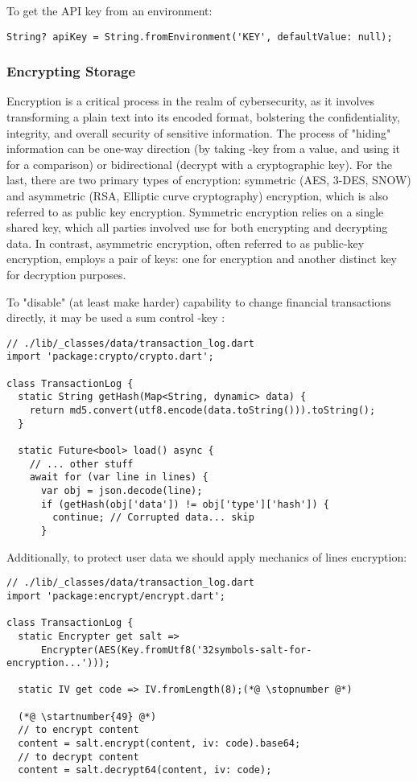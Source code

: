 \noindent To get the API key from an environment:

\begin{lstlisting}
String? apiKey = String.fromEnvironment('KEY', defaultValue: null);
\end{lstlisting}


\subsubsection{Encrypting Storage}

Encryption is a critical process in the realm of cybersecurity, as it involves transforming a plain text into its 
encoded format, bolstering the confidentiality, integrity, and overall security of sensitive information. The process 
of "hiding" information can be one-way direction (by taking -key from a value, and using it for a comparison) 
or bidirectional (decrypt with a cryptographic key). For the last, there are two primary types of encryption: symmetric 
(AES, 3-DES, SNOW) and asymmetric (RSA, Elliptic curve cryptography) encryption, which is also referred to as public 
key encryption. Symmetric encryption relies on a single shared key, which all parties involved use for both encrypting 
and decrypting data. In contrast, asymmetric encryption, often referred to as public-key encryption, employs a pair of 
keys: one for encryption and another distinct key for decryption purposes.

To "disable" (at least make harder) capability to change financial transactions directly, it may be used a sum control 
-key :

\begin{lstlisting}
// ./lib/_classes/data/transaction_log.dart
import 'package:crypto/crypto.dart';

class TransactionLog {
  static String getHash(Map<String, dynamic> data) {
    return md5.convert(utf8.encode(data.toString())).toString();
  }

  static Future<bool> load() async {
    // ... other stuff
    await for (var line in lines) {
      var obj = json.decode(line);
      if (getHash(obj['data']) != obj['type']['hash']) {
        continue; // Corrupted data... skip
      }
\end{lstlisting}

\noindent Additionally, to protect user data we should apply mechanics of lines encryption:

\begin{lstlisting}
// ./lib/_classes/data/transaction_log.dart
import 'package:encrypt/encrypt.dart';

class TransactionLog {
  static Encrypter get salt =>
      Encrypter(AES(Key.fromUtf8('32symbols-salt-for-encryption...')));

  static IV get code => IV.fromLength(8);(*@ \stopnumber @*)

  (*@ \startnumber{49} @*)
  // to encrypt content
  content = salt.encrypt(content, iv: code).base64;
  // to decrypt content
  content = salt.decrypt64(content, iv: code);
\end{lstlisting}


